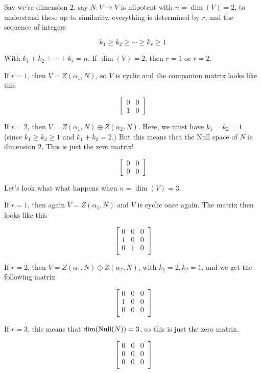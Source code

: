 \documentclass[12pt]{article}
\begin{document}
  Say we're dimension $2$, say $N: V \to V$ is nilpotent with $n = \dim(V) = 2$,
  to understand these up to similarity, everything is determined by $r$, and the
  sequence of integers

  \[
    k_1 \ge k_2 \ge \cdots \ge k_r \ge 1
  \]

  With $k_1 + k_2 + \cdots + k_r = n$. If $\dim(V) = 2$, then $r = 1$ or $r =
  2$.

  If $r = 1$, then $V = Z(\alpha_1, N)$, so $V$ is cyclic and the companion
  matrix looks like this

  \[
    \begin{bmatrix}
      0 & 0 \\
      1 & 0
    \end{bmatrix}
  \]

  If $r = 2$, then $V = Z(\alpha_1, N) \oplus Z(\alpha_2, N)$. Here, we must
  have $k_1 = k_2 = 1$ (since $k_1 \ge k_2 \ge 1$ and $k_1 + k_2 = 2$.) But this
  means that the Null space of $N$ is dimension $2$. This is just the zero
  matrix!

  \[
    \begin{bmatrix}
      0 & 0 \\
      0 & 0
    \end{bmatrix}
  \]

  Let's look what what happens when $n = \dim(V) = 3$.

  If $r = 1$, then again $V = Z(\alpha_1, N)$ and $V$ is cyclic once again. The
  matrix then looks like this

  \[
    \begin{bmatrix}
      0 & 0 & 0 \\
      1 & 0 & 0 \\
      0 & 1 & 0 \\
    \end{bmatrix}
  \]

  If $r = 2$, then $V = Z(\alpha_1, N) \oplus Z(\alpha_2, N)$, with $k_1 = 2,
  k_2 = 1$, and we get the following matrix

  \[
    \begin{bmatrix}
      0 & 0 & 0 \\
      1 & 0 & 0 \\
      0 & 0 & 0 \\
    \end{bmatrix}
  \]

  If $r = 3$, this means that $\dim(\mathrm{Null}(N)) = 3$, so this is just the zero
  matrix.

  \[
    \begin{bmatrix}
      0 & 0 & 0 \\
      0 & 0 & 0 \\
      0 & 0 & 0 \\
    \end{bmatrix}
  \]
\end{document}
